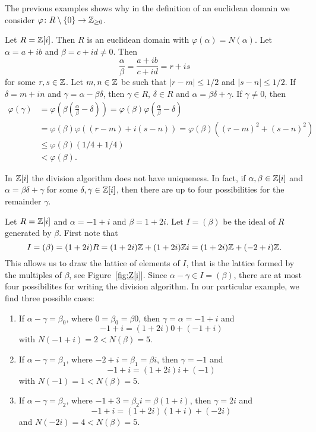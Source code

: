 The previous examples shows why in the definition of an euclidean domain 
we consider $\varphi\colon R\setminus\{0\}\to\mathbb{Z}_{\geq0}$. 

\begin{example}
	Let $R=\mathbb{Z}[i]$. Then $R$ is an euclidean domain with $\varphi(\alpha)=N(\alpha)$. Let 
	$\alpha=a+ib$ and $\beta=c+id\ne 0$. Then
	\[
	\frac{\alpha}{\beta}=\frac{a+ib}{c+id}=r+is
	\]
	for some $r,s\in\mathbb{Z}$. Let $m,n\in\mathbb{Z}$ be such that $|r-m|\leq 1/2$ and 
	$|s-n|\leq 1/2$. If $\delta=m+in$ and $\gamma=\alpha-\beta\delta$, then 
	$\gamma\in R$, $\delta\in R$ and $\alpha=\beta\delta+\gamma$. If $\gamma\ne0$, then
	\begin{align*}
	\varphi(\gamma)&=\varphi\left(\beta\left(\frac{\alpha}{\beta}-\delta\right)\right)
	=\varphi(\beta)\varphi\left(\frac{\alpha}{\beta}-\delta\right)\\
	&=\varphi(\beta)\varphi((r-m)+i(s-n))
	=\varphi(\beta)((r-m)^2+(s-n)^2)\\
	&\leq\varphi(\beta)(1/4+1/4)\\
	&<\varphi(\beta).
	\end{align*}	
\end{example}

In $\mathbb{Z}[i]$ the division algorithm does not have uniqueness. In fact, 
if $\alpha,\beta\in\mathbb{Z}[i]$ and $\alpha=\beta\delta+\gamma$ 
for some $\delta,\gamma\in\mathbb{Z}[i]$, 
then there are up to four possibilities 
for the remainder $\gamma$.


\begin{example}
	Let $R=\mathbb{Z}[i]$ and 
	$\alpha=-1+i$ and $\beta=1+2i$. Let $I=(\beta)$ be the ideal of $R$ generated by $\beta$. 
	First note that
	\[
	I=(\beta)=(1+2i)R=(1+2i)\mathbb{Z}+(1+2i)\mathbb{Z} i=(1+2i)\mathbb{Z}+(-2+i)\mathbb{Z}.
	\]  
	This allows us to draw the lattice of elements of $I$, 
	that is the lattice formed by the multiples of $\beta$, see Figure~\ref{fig:Z[i]}. 
	Since $\alpha-\gamma\in I=(\beta)$, there are at most four possibilites for writing
	the division algorithm. 
	In our particular example, we find three possible cases:
	\begin{enumerate}
		\item If $\alpha-\gamma=\beta_0$, where $0=\beta_0=\beta 0$, 
			then $\gamma=\alpha=-1+i$ and 
				\[
				-1+i=(1+2i)0+(-1+i)
				\]
				with $N(-1+i)=2<N(\beta)=5$. 
		\item If $\alpha-\gamma=\beta_1$, where $-2+i=\beta_1=\beta i$, then 
			$\gamma=-1$ and 
			\[
			-1+i=(1+2i)i+(-1)
			\]
			with $N(-1)=1<N(\beta)=5$. 
		\item If $\alpha-\gamma=\beta_2$, where $-1+3=\beta_2i=\beta (1+i)$, 
			then $\gamma=2i$ and  
			\[
			-1+i=(1+2i)(1+i)+(-2i)
			\]
			and $N(-2i)=4<N(\beta)=5$. 
	\end{enumerate}
\end{example}


